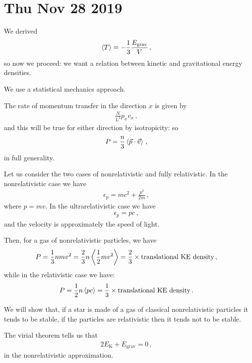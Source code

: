 \documentclass[main.tex]{subfiles}
\begin{document}
\section*{Thu Nov 28 2019}

We derived 
%
\begin{align}
  \expval{T} = -\frac{1}{3} \frac{E _{\text{grav}}}{V}
\,,
\end{align}
%
so now we proceed: we want a relation between kinetic and gravitational energy densities. 

We use a statistical mechanics approach. 

The rate of momentum transfer in the direction \(x\) is given by 
%
\begin{align}
  \frac{N}{L^3} p_x v_x
\,,
\end{align}
%
and this will be true for either direction by isotropicity: so 
%
\begin{align}
  P = \frac{n}{3} \expval{\vec{p} \cdot \vec{v}}
\,,
\end{align}
%
in full generality. 

Let us consider the two cases of nonrelativistic and fully relativistic. In the nonrelativistic case we have 
%
\begin{align}
  \epsilon_{p} = mc^2 + \frac{p^2}{2m}
\,,
\end{align}
%
where \(p = mv\). In the ultrarelativistic case we have 
%
\begin{align}
  \epsilon_{p} = pc
\,,
\end{align}
%
and the velocity is approximately the speed of light. 

Then, for a gas of nonrelativistic particles, we have 
%
\begin{align}
  P = \frac{1}{3} n mv^2 = \frac{2}{3} n \expval{\frac{1}{2}m v^2} = \frac{2}{3} \times \text{translational KE density}
\,,
\end{align}
%
while in the relativistic case we have: 
%
\begin{align}
  P = \frac{1}{2} n \expval{pc} = \frac{1}{3} \times \text{translational KE density}
\,.
\end{align}

We will show that, if a star is made of a gas of classical nonrelativistic particles it tends to be stable, if the particles are relativistic then it tends not to be stable.

The virial theorem tells us that 
%
\begin{align}
  2 E _{\text{K}} + E _{\text{grav}} = 0
\,,
\end{align}
%
in the nonrelativistic approximation. 
\end{document}
